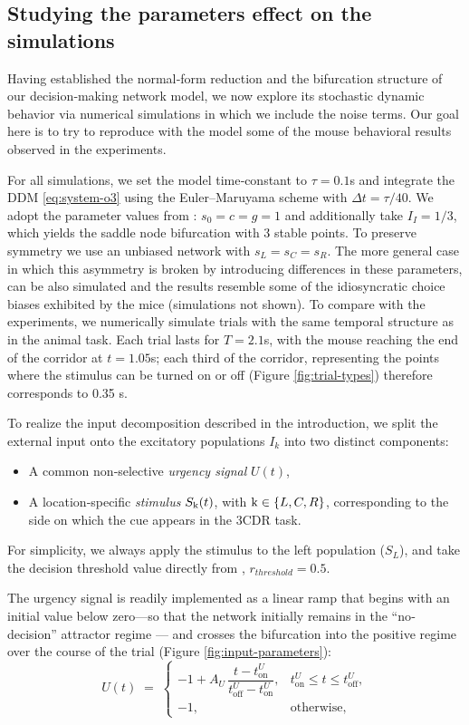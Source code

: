 \documentclass[../main.tex]{subfiles}
\begin{document}
\subsection{Studying the parameters effect on the simulations}
Having established the normal‐form reduction and the bifurcation structure of our decision‐making network model, we now explore its stochastic dynamic behavior via numerical simulations in which we include the noise terms.  Our goal here is to try to reproduce with the model some of the mouse behavioral results observed in the experiments.

For all simulations, we set the model time‐constant to \(\tau=0.1\)s and integrate the DDM \eqref{eq:system-o3} using the Euler–Maruyama scheme with \(\Delta t = \tau/40\).  We adopt the parameter values from \cite{roxin2019}: \(s_{0}=c=g=1\) and additionally take \(I_{I}=1/3\), which yields the saddle node bifurcation with 3 stable points. To preserve symmetry we use an unbiased network with \(s_{L}=s_{C}=s_{R}\). The more general case in which this asymmetry is broken by introducing differences in these parameters, can be also simulated and the results resemble some of the idiosyncratic choice biases exhibited by the mice (simulations not shown). To compare with the experiments, we numerically simulate trials with the same temporal structure as in the animal task. Each trial lasts for \(T=2.1\)s, with the mouse reaching the end of the corridor at \(t=1.05\)s; each third of the corridor, representing the points where the stimulus can be turned on or off (Figure \ref{fig:trial-types}) therefore corresponds to 0.35 s.  

To realize the input decomposition described in the introduction, we split the external input onto the excitatory populations \(I_k\) into two distinct components:
\begin{itemize}
  \item A common non‐selective \emph{urgency signal} \(U(t)\), 
  \item A location‐specific \emph{stimulus} \(S_{\mathrm{k}}(t)\), with \(\mathrm{k}\in\{L,C,R\}\), corresponding to the side on which the cue appears in the 3CDR task.
\end{itemize}
For simplicity, we always apply the stimulus to the left population (\(S_L\)), and take the decision threshold value directly from \cite{roxin2019}, $r_{threshold} = 0.5$.

The urgency signal is readily implemented as a linear ramp that begins with an initial value below zero—so that the network initially remains in the ``no‐decision'' attractor regime — and crosses the bifurcation into the positive regime over the course of the trial (Figure \ref{fig:input-parameters}):
\[
U(t) \;=\;
\begin{cases}
-1 + A_U\,\dfrac{t - t_{\mathrm{on}}^U}{t_{\mathrm{off}}^U - t_{\mathrm{on}}^U}, 
& t_{\mathrm{on}}^U \le t \le t_{\mathrm{off}}^U,\\[6pt]
-1, & \text{otherwise},
\end{cases}
\]
\end{document}
